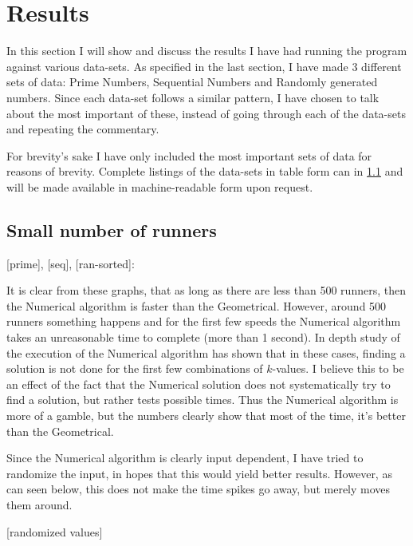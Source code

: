 \section{Results}
\label{results}
In this section I will show and discuss the results I have had running the program against various data-sets. As specified in the last section, I have made 3 different sets of data: Prime Numbers, Sequential Numbers and Randomly generated numbers. Since each data-set follows a similar pattern, I have chosen to talk about the most important of these, instead of going through each of the data-sets and repeating the commentary. 


For brevity's sake I have only included the most important sets of data for reasons of brevity. Complete listings of the data-sets in table form can in \ref{} and will be made available in machine-readable form upon request.


\subsection{Small number of runners}



[prime], [seq], [ran-sorted]:

It is clear from these graphs, that as long as there are less than 500 runners, then the Numerical algorithm is faster than the Geometrical. However, around 500 runners something happens and for the first few speeds the Numerical algorithm takes an unreasonable time to complete (more than 1 second). In depth study of the execution of the Numerical algorithm has shown that in these cases, finding a solution is not done for the first few combinations of $k$-values. I believe this to be an effect of the fact that the Numerical solution does not systematically try to find a solution, but rather tests possible times. Thus the Numerical algorithm is more of a gamble, but the numbers clearly show that most of the time, it's better than the Geometrical.

Since the Numerical algorithm is clearly input dependent, I have tried to randomize the input, in hopes that this would yield better results. However, as can seen below, this does not make the time spikes go away, but merely moves them around.

[randomized values]




